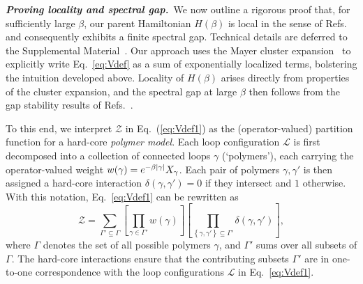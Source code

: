 \documentclass[aps,prl,twocolumn,floatfix,nofootinbib]{revtex4-2}
\theoremstyle{definition}
\newcommand{\curly}[1]{\left\{ #1 \right\}}
\begin{document}
{\bf \emph{Proving locality and spectral gap.}}~We now outline a rigorous proof that, for sufficiently large $\beta$, our parent Hamiltonian $H(\beta)$ is local in the sense of Refs.~ and consequently exhibits a finite spectral gap. Technical details are deferred to the Supplemental Material~\cite{SOM}. Our approach uses the Mayer cluster expansion~\cite{Friedli_Velenik_2017} to explicitly write Eq.~\eqref{eq:Vdef} as a sum of exponentially localized terms, bolstering the intuition developed above. Locality of $H(\beta)$ arises directly from properties of the cluster expansion, and the spectral gap at large $\beta$ then follows from the gap stability results of Refs.~.



To this end, we interpret $\mathcal{Z}$ in Eq.~(\ref{eq:Vdef1}) as the (operator-valued) partition function for a hard-core \emph{polymer model}. Each loop configuration $\mathcal{L}$ is first decomposed into a collection of connected loops $\gamma$ (`polymers'), each carrying the operator-valued weight $w(\gamma) = e^{-\beta \abs{\gamma}} X_{\gamma}$. Each pair of polymers $\gamma, \gamma'$ is then assigned a hard-core interaction $\delta(\gamma, \gamma') = 0$ if they intersect and $1$ otherwise. With this notation, Eq.~\eqref{eq:Vdef1} can be rewritten as
\begin{equation}
    \mathcal{Z} = \sum_{\Gamma' \subseteq \Gamma } \left[\prod_{\gamma \in \Gamma'} w(\gamma) \right] \left[\prod_{\curly{\gamma, \gamma'} \subseteq \Gamma'}  \delta(\gamma, \gamma')\right] ,
    \label{eqn:polymer_model}
\end{equation}
where $\Gamma$ denotes the set of all possible polymers $\gamma$, and $\Gamma'$ sums over all subsets of $\Gamma$. The hard-core interactions ensure that the contributing subsets $\Gamma'$ are in one-to-one correspondence with the loop configurations $\mathcal{L}$ in Eq.~\eqref{eq:Vdef1}.
\end{document}
